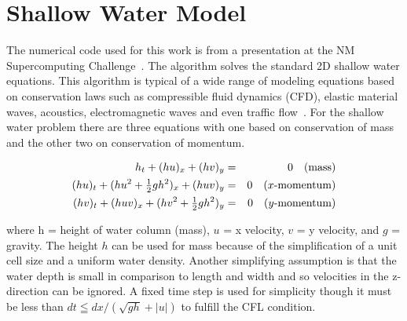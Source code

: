 \section{Shallow Water Model}
\label{sec:shallow-water}

The numerical code used for this work is from a presentation at the
NM Supercomputing Challenge~\cite{Robey07}.
The algorithm solves the standard 2D shallow water equations. This
algorithm is typical of a wide range of modeling equations based on
conservation laws such as compressible fluid dynamics (CFD), elastic
material waves, acoustics, electromagnetic waves and even traffic
flow~\cite{Leveque02}. For the shallow water problem there are
three equations with one based on conservation of mass and the other
two on conservation of momentum.

\begin{eqnarray*}
h_{t}+(hu)_{x}+(hv)_{y} & = & 0\quad\mbox{(mass)}\\
(hu)_{t}+(h{u}^{2}+\tfrac{1}{2}gh^{2})_{x}+(huv)_{y} & = & 0\mbox{\quad($x$-momentum)}\\
(hv)_{t}+(huv)_{x}+(h{v}^{2}+\tfrac{1}{2}gh^{2})_{y} & = & 0\mbox{\quad($y$-momentum)}
\end{eqnarray*}



\noindent
where h = height of water column (mass), $u$ = x velocity, $v$ =
y velocity, and $g$ = gravity. The height $h$ can be used for mass
because of the simplification of a unit cell size and a uniform water
density. Another simplifying assumption is that the water depth is
small in comparison to length and width and so velocities in the z-direction
can be ignored. A fixed time step is used for simplicity though it
must be less than $dt \leqq dx / (\sqrt{gh}+|u|)$ to fulfill the CFL
condition.

